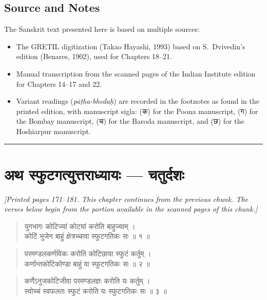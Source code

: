 \documentclass[11pt,a4paper]{article}
\newcommand{\longline}{\noindent\rule{\textwidth}{0.4pt}}
\newcommand{\cnote}[1]{\textcolor{notecolor}{\textit{#1}}}
\newcommand{\dev}[1]{{\devanagarifont #1}}
\newcommand{\dsec}[1]{\section*{\dev{#1}}}
\newenvironment{shloka}{\begin{verse}\devanagarifont\large}{\end{verse}}
\begin{document}
\subsection*{Source and Notes}

The Sanskrit text presented here is based on multiple sources:
\begin{itemize}
  \item The GRETIL digitization (Takao Hayashi, 1993) based on
    S.~Dvivedin's edition (Benares, 1902), used for Chapters 18–21.
  \item Manual transcription from the scanned pages of the Indian
    Institute edition for Chapters 14–17 and 22.
  \item Variant readings (\textit{pāṭha-bhedaḥ}) are recorded in the
    footnotes as found in the printed edition, with manuscript
    sigla: (क) for the Poona manuscript, (ग) for the Bombay manuscript,
    (च) for the Baroda manuscript, and (छ) for the Hoshiarpur manuscript.
\end{itemize}

\longline

\newpage

\dsec{अथ स्फुटगत्युत्तराध्यायः — चतुर्दशः}

\cnote{[Printed pages 171–181. This chapter continues from the previous
chunk. The verses below begin from the portion available in the scanned
pages of this chunk.]}

\begin{shloka}
युगभागः कोटिज्यां कोट्यां करोति बाहुज्याम् ।\\
कोटिं भुजेन बाहुं क्षेत्रच्चावा स्फुटगतिकः सः ॥ १ ॥
\end{shloka}

\begin{shloka}
परमण्डलकर्णविकः करोति कोटिछाया स्फुटं कर्तुम् ।\\
कर्णान्तकोटिकोण्डा बाहुं वा स्फुटगतिकः सः ॥ २ ॥
\end{shloka}

\begin{shloka}
कर्णेऽनुजकोटिजीवा परमण्डलज्ञः करोति यः कर्तुम् ।\\
स्वोच्चं स्वफलतः स्फुटं करोति यः स्फुटगतिकः सः ॥ ३ ॥
\end{shloka}
\end{document}
